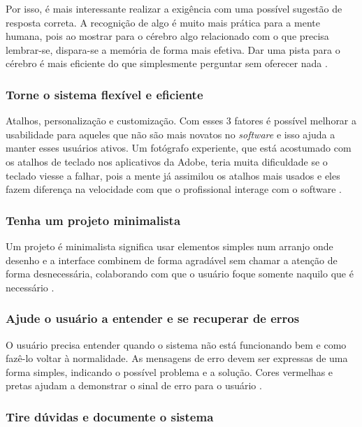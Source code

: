 Por isso, é mais interessante realizar a exigência com uma possível sugestão de resposta correta. A recognição de algo é muito mais prática para a mente humana, pois ao mostrar para o cérebro algo relacionado com o que precisa lembrar-se, dispara-se a memória de forma mais efetiva. Dar uma pista para o cérebro é mais eficiente do que simplesmente perguntar sem oferecer nada \cite{site:nielsenRecall}.

\subsubsection{Torne o sistema flexível e eficiente}

Atalhos, personalização e customização. Com esses 3 fatores é possível melhorar a usabilidade para aqueles que não são mais novatos no \textit{software} e isso ajuda a manter esses usuários ativos. Um fotógrafo experiente, que está acostumado com os atalhos de teclado nos aplicativos da Adobe, teria muita dificuldade se o teclado viesse a falhar, pois a mente já assimilou os atalhos mais usados e eles fazem diferença na velocidade com que o profissional interage com o software \cite{site:nielsenFlexibility}.

\subsubsection{Tenha um projeto minimalista}

Um projeto é minimalista significa usar elementos simples num arranjo onde desenho e a interface combinem de forma agradável sem chamar a atenção de forma desnecessária, colaborando com que o usuário foque somente naquilo que é necessário \cite{site:nielsen}.

\subsubsection{Ajude o usuário a entender e se recuperar de erros}

O usuário precisa entender quando o sistema não está funcionando bem e como fazê-lo voltar à normalidade. As mensagens de erro devem ser expressas de uma forma simples, indicando o possível problema e a solução. 
Cores vermelhas e pretas ajudam a demonstrar o sinal de erro para o usuário \cite{site:nielsenError}.

\subsubsection{Tire dúvidas e documente o sistema}

